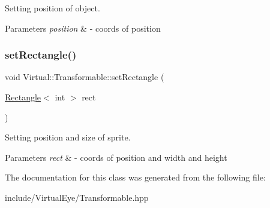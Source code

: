Setting position of object. 


\begin{DoxyParams}{Parameters}
{\em position} & -\/ coords of position \\
\hline
\end{DoxyParams}
\hypertarget{class_virtual_1_1_transformable_ad86a98728222a2b879afa41ba27dfc58}{}\label{class_virtual_1_1_transformable_ad86a98728222a2b879afa41ba27dfc58} 
\subsubsection{\texorpdfstring{set\+Rectangle()}{setRectangle()}}
{\footnotesize\ttfamily void Virtual\+::\+Transformable\+::set\+Rectangle (\begin{DoxyParamCaption}\item[{\hyperlink{struct_virtual_1_1_rectangle}{Rectangle}$<$ int $>$}]{rect }\end{DoxyParamCaption})}



Setting position and size of sprite. 


\begin{DoxyParams}{Parameters}
{\em rect} & -\/ coords of position and width and height \\
\hline
\end{DoxyParams}


The documentation for this class was generated from the following file\+:\begin{DoxyCompactItemize}
\item 
include/\+Virtual\+Eye/Transformable.\+hpp\end{DoxyCompactItemize}
